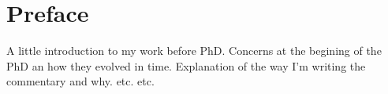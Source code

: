 \chapter{Preface}



A little introduction to my work before PhD. Concerns at the begining of the PhD an how they evolved in time. Explanation of the way I'm writing the commentary and why. etc. etc.


\label{ch:intro}
